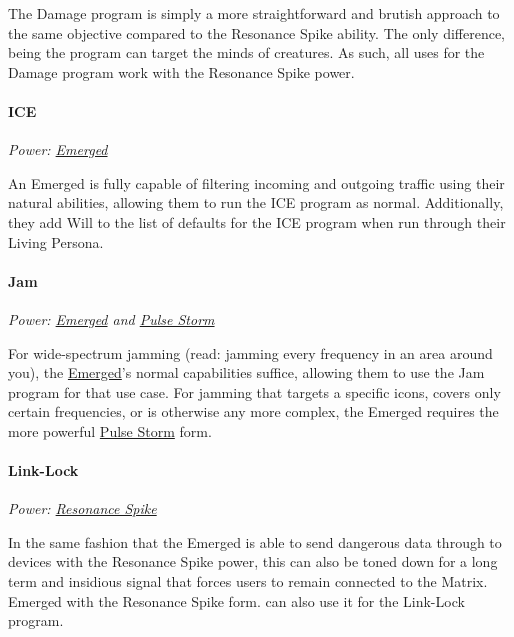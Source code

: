 \begin{multicols*}{3}
	The Damage program is simply a more straightforward and brutish approach to the same objective compared to the Resonance Spike ability. The only difference, being the program can target the minds of creatures. As such, all uses for the Damage program work with the Resonance Spike power.
	
	\paragraph{ICE}
	\begin{center}
		\textit{Power: \hyperref[emerged]{Emerged}}
	\end{center}

	An Emerged is fully capable of filtering incoming and outgoing traffic using their natural abilities, allowing them to run the ICE program as normal. Additionally, they add Will to the list of defaults for the ICE program when run through their Living Persona.
	
	\paragraph{Jam}
	\begin{center}
		\textit{Power: \hyperref[emerged]{Emerged} and \hyperref[pulse_storm]{Pulse Storm}}
	\end{center}

	For wide-spectrum jamming (read: jamming every frequency in an area around you), the \hyperref[emerged]{Emerged}'s normal capabilities suffice, allowing them to use the Jam program for that use case. For jamming that targets a specific icons, covers only certain frequencies, or is otherwise any more complex, the Emerged requires the more powerful \hyperref[pulse_storm]{Pulse Storm} form.
	
	\paragraph{Link-Lock}
	\begin{center}
		\textit{Power: \hyperref[resonance_spike]{Resonance Spike}}
	\end{center}

	In the same fashion that the Emerged is able to send dangerous data through to devices with the Resonance Spike power, this can also be toned down for a long term and insidious signal that forces users to remain connected to the Matrix. Emerged with the Resonance Spike form. can also use it for the Link-Lock program.
	

\end{multicols*}
